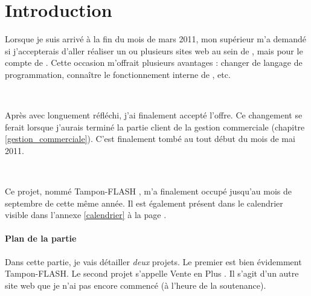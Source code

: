 \chapter{Introduction}
Lorsque je suis arrivé à la fin du mois de mars 2011, mon supérieur m'a demandé si j'accepterais d'aller réaliser un ou plusieurs sites web au sein de \fidit{}, mais pour le compte de \solulog. Cette occasion m'offrait plusieurs avantages : changer de langage de programmation, connaître le fonctionnement interne de \fidit, etc.

~

Après avec longuement réfléchi, j'ai finalement accepté l'offre. Ce changement se ferait lorsque j'aurais terminé la partie client de la gestion commerciale (chapitre \ref{gestion_commerciale}). C'est finalement tombé au tout début du mois de mai 2011.

~

Ce projet, nommé \og Tampon-FLASH \fg, m'a finalement occupé jusqu'au mois de septembre de cette même année. Il est également présent dans le calendrier visible dans l'annexe \ref{calendrier} à la page \pageref{calendrier}.

\subsubsection{Plan de la partie}
Dans cette partie, je vais détailler \emph{deux} projets. Le premier est bien évidemment Tampon-FLASH. Le second projet s'appelle \og Vente en Plus \fg. Il s'agit d'un autre site web que je n'ai pas encore commencé (à l'heure de la soutenance).
